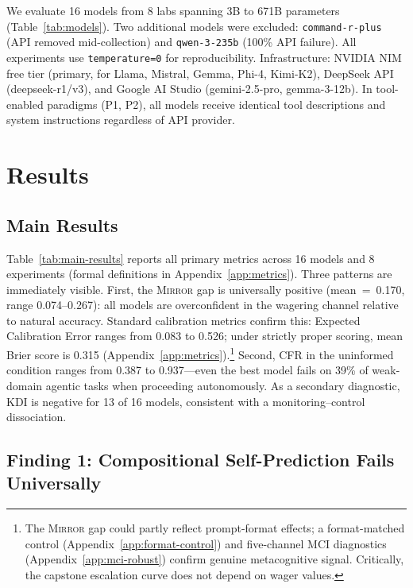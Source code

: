 \documentclass[10pt]{article}
\newcommand{\mirror}{\textsc{Mirror}}
\newcommand{\KDI}{KDI}
\newcommand{\CFR}{CFR}
\begin{document}


We evaluate 16 models from 8 labs spanning 3B to 671B parameters
(Table~\ref{tab:models}). Two additional models were excluded: \texttt{command-r-plus} (API removed mid-collection) and \texttt{qwen-3-235b} (100\% API failure). All experiments use \texttt{temperature=0} for reproducibility. Infrastructure: NVIDIA NIM free tier (primary, for Llama, Mistral, Gemma, Phi-4, Kimi-K2), DeepSeek API (deepseek-r1/v3), and Google AI Studio (gemini-2.5-pro, gemma-3-12b). In tool-enabled paradigms (P1, P2), all models receive identical tool descriptions and system instructions regardless of API provider.

\section{Results}
\label{sec:results}

\subsection{Main Results}

Table~\ref{tab:main-results} reports all primary metrics across 16 models and 8
experiments (formal definitions in Appendix~\ref{app:metrics}). Three patterns are immediately visible. First, the \mirror{} gap is
universally positive (mean~=~0.170, range 0.074--0.267): all models are
overconfident in the wagering channel relative to natural accuracy.
Standard calibration metrics confirm this: Expected Calibration Error ranges from 0.083 to 0.526; under strictly proper scoring, mean Brier score is 0.315 (Appendix~\ref{app:metrics}).\footnote{The \mirror{} gap could partly reflect prompt-format effects; a format-matched control (Appendix~\ref{app:format-control}) and five-channel MCI diagnostics (Appendix~\ref{app:mci-robust}) confirm genuine metacognitive signal. Critically, the capstone escalation curve does not depend on wager values.}
Second, \CFR{}
in the uninformed condition ranges from 0.387 to 0.937---even the best model fails
on 39\% of weak-domain agentic tasks when proceeding autonomously. As a secondary diagnostic, \KDI{} is negative for 13 of 16 models, consistent with a monitoring--control dissociation.



\subsection{Finding 1: Compositional Self-Prediction Fails Universally}
\end{document}
